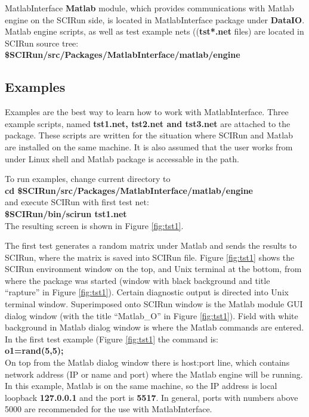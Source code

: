 \documentclass[12pt]{IEEEtran}
\begin{document}
MatlabInterface {\bf Matlab} module, which provides communications with 
Matlab engine on the SCIRun side, is located in MatlabInterface 
package under {\bf DataIO}. Matlab engine scripts, as well as test 
example nets (({\bf tst*.net} files) are located in SCIRun source tree: \\
{\bf \$SCIRun/src/Packages/MatlabInterface/matlab/engine }\\

\subsection*{Examples} \indent

Examples are the best way to learn how to work with MatlabInterface.
Three example scripts, named {\bf tst1.net, tst2.net and tst3.net}
are attached to the package.
These scripts are written for the situation where SCIRun and 
Matlab are installed on the same machine. 
It is also assumed that the user works from under Linux
shell and Matlab package is accessable in the path. 

To run examples, change current directory to \\
{\bf cd \$SCIRun/src/Packages/MatlabInterface/matlab/engine } \\
and execute SCIRun with first test net: \\
{\bf \$SCIRun/bin/scirun  tst1.net} \\
The resulting screen is shown in Figure \ref{fig:tst1}.

The first test generates a random matrix under Matlab and sends the
results to SCIRun, where the matrix is saved into SCIRun file. 
Figure \ref{fig:tst1} shows the SCIRun environment window on the top,
and Unix terminal at the bottom, from where the package was started
(window with black background and title ``rapture'' in Figure 
\ref{fig:tst1}).  Certain diagnostic output is directed into Unix 
terminal window. Superimposed onto SCIRun window is the Matlab 
module GUI dialog window (with the title ``Matlab\_O'' in
Figure \ref{fig:tst1}). Field with white
background in Matlab dialog window is where the Matlab commands
are entered. In the first test example (Figure \ref{fig:tst1}
the command is: \\
{\bf o1=rand(5,5);} \\

On top from the Matlab dialog window there is host:port line, which
contains network address (IP or name and port) where the Matlab 
engine will be running. In this example, Matlab is on the same
machine, so the IP address is local loopback {\bf 127.0.0.1} and 
the port is {\bf 5517}. In general, ports with numbers above 5000
are recommended for the use with MatlabInterface. 
\end{document}
